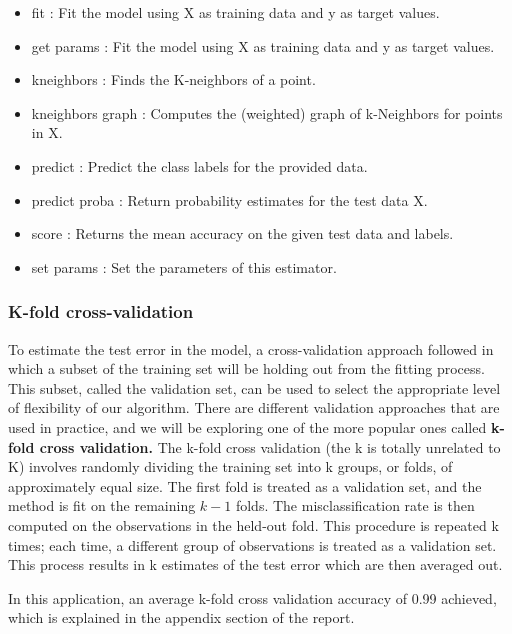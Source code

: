 \documentclass[sigconf]{acmart}
\begin{document}
\begin{itemize}
\item {fit :} Fit the model using X as training data and y as target values.
\item {get params :} Fit the model using X as training data and y as target values.
\item {kneighbors :} Finds the K-neighbors of a point.
\item {kneighbors graph :} Computes the (weighted) graph of k-Neighbors for points in X.
\item {predict :} Predict the class labels for the provided data.
\item {predict proba :} Return probability estimates for the test data X.
\item {score :} Returns the mean accuracy on the given test data and labels.
\item {set params :} Set the parameters of this estimator.
\end{itemize}

\subsubsection{K-fold cross-validation}
To estimate the test error in the model, a cross-validation approach followed in which a subset of the training set will be holding out from the fitting process. This subset, called the validation set, can be used to select the appropriate level of flexibility of our algorithm. There are different validation approaches that are used in practice, and we will be exploring one of the more popular ones called \textbf{k-fold cross validation.}
The k-fold cross validation (the k is totally unrelated to K) involves randomly dividing the training set into k groups, or folds, of approximately equal size. The first fold is treated as a validation set, and the method is fit on the remaining \(k-1\) folds. The misclassification rate is then computed on the observations in the held-out fold. This procedure is repeated k times; each time, a different group of observations is treated as a validation set. This process results in k estimates of the test error which are then averaged out. 

In this application, an average k-fold cross validation accuracy of 0.99 achieved, which is explained in the appendix section of the report.
\end{document}
